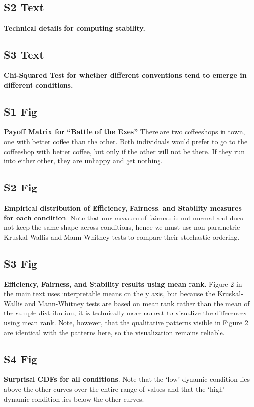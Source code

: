 \documentclass[10pt,letterpaper]{article}
\begin{document}
\subsection*{S2 Text}
\label{S2_Text}
{\bf Technical details for computing stability.}

\subsection*{S3 Text}
\label{S3_Text}
{\bf Chi-Squared Test for whether different conventions tend to emerge in different conditions.}

\subsection*{S1 Fig}
\label{S1_Fig}
{\bf Payoff Matrix for ``Battle of the Exes''} There are two coffeeshops in town, one with better coffee than the other. Both individuals would prefer to go to the coffeeshop with better coffee, but only if the other will not be there. If they run into either other, they are unhappy and get nothing.

\subsection*{S2 Fig}
\label{S2_Fig}
{\bf Empirical distribution of Efficiency, Fairness, and Stability measures for each condition}. Note that our measure of fairness is not normal and does not keep the same shape across conditions, hence we must use non-parametric Kruskal-Wallis and Mann-Whitney tests to compare their stochastic ordering.

\subsection*{S3 Fig}
\label{S3_Fig}
{\bf Efficiency, Fairness, and Stability results using mean rank}. Figure 2 in the main text uses interpretable means on the y axis, but because the Kruskal-Wallis and Mann-Whitney tests are based on mean rank rather than the mean of the sample distribution, it is technically more correct to visualize the differences using mean rank. Note, however, that the qualitative patterns visible in Figure 2 are identical with the patterns here, so the visualization remains reliable.

\subsection*{S4 Fig}
\label{S4_Fig}
{\bf Surprisal CDFs for all conditions}. Note that the `low' dynamic condition lies above the other curves over the entire range of values and that the `high' dynamic condition lies below the other curves.
\end{document}
